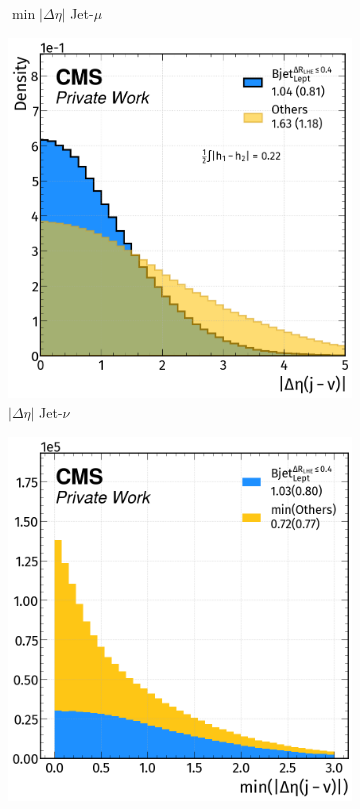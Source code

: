 \begin{figure}[H]
\begin{subfigure}{0.47\linewidth}
        \caption{$\min|\Delta \eta|$ Jet-$\mu$}
    \end{subfigure}  
    \hfill
    \begin{subfigure}{0.49\linewidth}
        \centering
        \includegraphics[width=1\linewidth]{fig//chap08-kin_reco/deta_nu.png}
        \caption{$|\Delta \eta|$ Jet-$\nu$}
    \end{subfigure}
    \hfill
    \begin{subfigure}{0.4825\linewidth}  
        \centering
        \includegraphics[width=1\linewidth]{fig//chap08-kin_reco/min_deta_nu.png}

\end{subfigure}
\end{figure}
